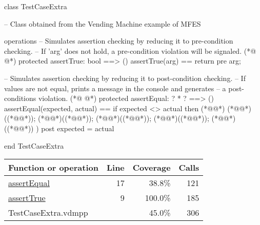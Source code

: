 \begin{vdmpp}[breaklines=true]
class TestCaseExtra

 -- Class obtained from the Vending Machine example of MFES
 
 
 operations
 -- Simulates assertion checking by reducing it to pre-condition checking.
 -- If 'arg' does not hold, a pre-condition violation will be signaled.
(*@
\label{assertTrue:9}
@*)
 protected assertTrue: bool ==> ()
 assertTrue(arg) == 
  return 
 pre arg;
  
 -- Simulates assertion checking by reducing it to post-condition checking.
 -- If values are not equal, prints a message in the console and generates 
 -- a post-conditions violation.
(*@
\label{assertEqual:17}
@*)
 protected assertEqual: ? * ? ==> ()
 assertEqual(expected, actual) == 
  if expected <> actual then (*@\vdmnotcovered{(}@*)
     (*@@*)((*@@*));
     (*@@*)((*@@*)); 
     (*@@*)((*@@*));
     (*@@*)((*@@*));
     (*@@*)((*@@*))
  )
 post expected = actual
 
end TestCaseExtra


\end{vdmpp}
\bigskip
\begin{longtable}{|l|r|r|r|}
\hline
Function or operation & Line & Coverage & Calls \\
\hline
\hline
\hyperref[assertEqual:17]{assertEqual} & 17&38.8\% & 121 \\
\hline
\hyperref[assertTrue:9]{assertTrue} & 9&100.0\% & 185 \\
\hline
\hline
TestCaseExtra.vdmpp & & 45.0\% & 306 \\
\hline
\end{longtable}

